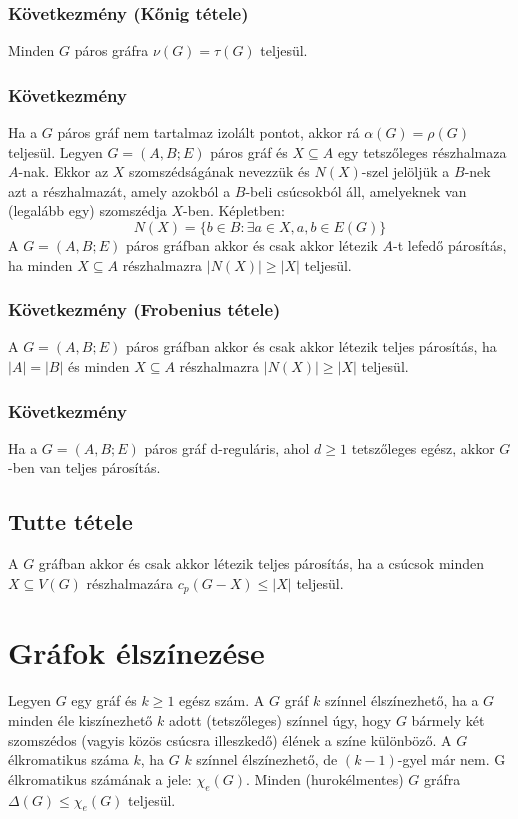 \documentclass[12pt,a4paper,twoside]{report}
\begin{document}
\subsubsection{Következmény (Kőnig tétele)}
Minden $G$ páros gráfra $\nu(G) = \tau(G)$ teljesül.
\subsubsection{Következmény}
Ha a $G$ páros gráf nem tartalmaz izolált pontot, akkor rá $\alpha(G) = \rho(G)$ teljesül.
\df 
Legyen $G = (A, B; E)$ páros gráf és $X\subseteq A$ egy tetszőleges részhalmaza $A$-nak. Ekkor az $X$ szomszédságának nevezzük és $N(X)$-szel jelöljük a $B$-nek azt a részhalmazát, amely azokból a $B$-beli csúcsokból áll, amelyeknek van (legalább egy) szomszédja $X$-ben. Képletben:
 $$N(X) = \{b\in B : \exists a \in X, {a, b} \in E(G) \}$$
\ttl
	A $G = (A, B; E)$ páros gráfban akkor és csak akkor létezik $A$-t lefedő
párosítás, ha minden $X\subseteq A$ részhalmazra $|N(X)| \geq |X|$ teljesül.
\subsubsection{Következmény (Frobenius tétele)}
A $G = (A, B; E)$ páros gráfban akkor és csak akkor létezik teljes párosítás, ha
$|A| = |B|$ és minden $X \subseteq A$ részhalmazra $|N(X)| \geq |X|$ teljesül.
\subsubsection{Következmény}
Ha a $G = (A, B; E)$ páros gráf d-reguláris, ahol $d \geq 1$ tetszőleges egész, akkor $G$-ben van teljes párosítás.
\subsection{Tutte tétele}
A $G$ gráfban akkor és csak akkor létezik teljes párosítás, ha a csúcsok minden
$X\subseteq V(G)$ részhalmazára $c_p (G - X) \leq |X|$ teljesül.
\section{Gráfok élszínezése}
\df
Legyen $G$ egy gráf és $k \geq 1$ egész szám. A $G$ gráf $k$ színnel élszínezhető, ha a $G$ minden éle kiszínezhető $k$ adott (tetszőleges) színnel úgy, hogy $G$
bármely két szomszédos (vagyis közös csúcsra illeszkedő) élének a színe különböző. A $G$ élkromatikus száma $k$, ha $G$ $k$ színnel élszínezhető, de $(k - 1)$-gyel már nem. G élkromatikus számának a jele: $\chi_e(G)$.
\al 
Minden (hurokélmentes) $G$ gráfra $\Delta(G) \leq\chi_e(G)$ teljesül.
\end{document}
